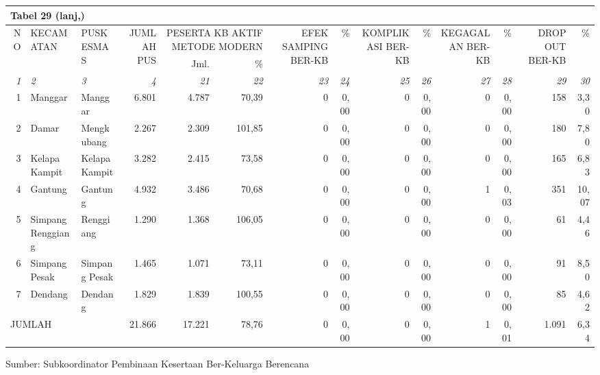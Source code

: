 \begin{small}
	\begin{tabular}{rllrrrrrrrrrrr}
		\multicolumn{14}{l}{Tabel 29 (lanj,)}\\
		\toprule
		\multirow{2}{*}{NO} & \multirow{2}{*}{KECAMATAN} & \multirow{2}{*}{PUSKESMAS} & \multirow{2}{*}{JUMLAH PUS} & \multicolumn{2}{X{10em}}{PESERTA KB AKTIF METODE MODERN} & \multirow{2}{6em}{\raggedleft EFEK SAMPING BER-KB} & \multirow{2}{*}{\%} & \multirow{2}{6em}{\raggedleft KOMPLIKASI BER-KB} & \multirow{2}{*}{\%} & \multirow{2}{6em}{\raggedleft KEGAGALAN BER-KB} & \multirow{2}{*}{\%} & \multirow{2}{6em}{\raggedleft DROP OUT BER-KB} & \multirow{2}{*}{\%}\\
		\cmidrule{5-6}
		& & & & Jml. & \% & & & & & & & & \\
		\midrule
		\emph{1} & \emph{2} & \emph{3} & \emph{4} & \emph{21} & \emph{22} & \emph{23} & \emph{24} & \emph{25} & \emph{26} & \emph{27} & \emph{28} & \emph{29} & \emph{30} \\
		\midrule
		1 & Manggar           & Manggar       &  6.801 &  4.787 &  70,39 & 0 & 0,00 & 0 & 0,00 & 0 & 0,00 &   158 &  3,30 \\
		2 & Damar             & Mengkubang    &  2.267 &  2.309 & 101,85 & 0 & 0,00 & 0 & 0,00 & 0 & 0,00 &   180 &  7,80 \\
		3 & Kelapa Kampit     & Kelapa Kampit &  3.282 &  2.415 &  73,58 & 0 & 0,00 & 0 & 0,00 & 0 & 0,00 &   165 &  6,83 \\
		4 & Gantung           & Gantung       &  4.932 &  3.486 &  70,68 & 0 & 0,00 & 0 & 0,00 & 1 & 0,03 &   351 & 10,07 \\
		5 & Simpang Renggiang & Renggiang     &  1.290 &  1.368 & 106,05 & 0 & 0,00 & 0 & 0,00 & 0 & 0,00 &    61 &  4,46 \\
		6 & Simpang Pesak     & Simpang Pesak &  1.465 &  1.071 &  73,11 & 0 & 0,00 & 0 & 0,00 & 0 & 0,00 &    91 &  8,50 \\
		7 & Dendang           & Dendang       &  1.829 &  1.839 & 100,55 & 0 & 0,00 & 0 & 0,00 & 0 & 0,00 &    85 &  4,62 \\
		\midrule
		\multicolumn{3}{l}{JUMLAH}            & 21.866 & 17.221 &  78,76 & 0 & 0,00 & 0 & 0,00 & 1 & 0,01 & 1.091 &  6,34 \\
		\bottomrule
	\end{tabular}%
\end{small} 

\vfill
Sumber: Subkoordinator Pembinaan Kesertaan Ber-Keluarga Berencana\par 